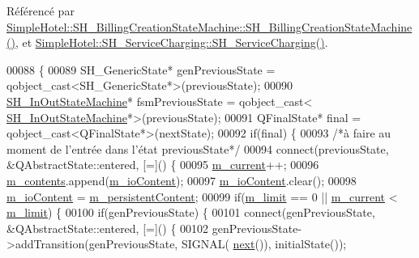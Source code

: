 Référencé par \hyperlink{classSimpleHotel_1_1SH__BillingCreationStateMachine_a8c7d39e11d0ced1fd9c27a5550465b86}{Simple\-Hotel\-::\-S\-H\-\_\-\-Billing\-Creation\-State\-Machine\-::\-S\-H\-\_\-\-Billing\-Creation\-State\-Machine()}, et \hyperlink{classSimpleHotel_1_1SH__ServiceCharging_ae82c86c7e955f0dc93cdfc3603789b87}{Simple\-Hotel\-::\-S\-H\-\_\-\-Service\-Charging\-::\-S\-H\-\_\-\-Service\-Charging()}.


\begin{DoxyCode}
00088 \{
00089     SH\_GenericState* genPreviousState = qobject\_cast<SH\_GenericState*>(previousState);
00090     \hyperlink{classSimpleHotel_1_1SH__InOutStateMachine_af725c1a19c2b13b7f07f3966e632a00b}{SH\_InOutStateMachine}* fsmPreviousState = qobject\_cast<
      \hyperlink{classSimpleHotel_1_1SH__InOutStateMachine_af725c1a19c2b13b7f07f3966e632a00b}{SH\_InOutStateMachine}*>(previousState);
00091     QFinalState* \textcolor{keyword}{final} = qobject\_cast<QFinalState*>(nextState);
00092     \textcolor{keywordflow}{if}(\textcolor{keyword}{final}) \{
00093         \textcolor{comment}{/*à faire au moment de l'entrée dans l'état previousState*/}
00094         connect(previousState, &QAbstractState::entered, [=]() \{
00095             \hyperlink{classSimpleHotel_1_1SH__LoopingInOutStateMachine_a700a3c54ef593c94815a0418d83dd381}{m\_current}++;
00096             \hyperlink{classSimpleHotel_1_1SH__LoopingInOutStateMachine_a46c3dab932ceedeef821a25fa8d6e5dd}{m\_contents}.append(\hyperlink{classSimpleHotel_1_1SH__InOutStateMachine_a4b0a3a48b0da31fddb724a357ad9b52c}{m\_ioContent});
00097             \hyperlink{classSimpleHotel_1_1SH__InOutStateMachine_a4b0a3a48b0da31fddb724a357ad9b52c}{m\_ioContent}.clear();
00098             \hyperlink{classSimpleHotel_1_1SH__InOutStateMachine_a4b0a3a48b0da31fddb724a357ad9b52c}{m\_ioContent} = \hyperlink{classSimpleHotel_1_1SH__LoopingInOutStateMachine_a6ed5f5c62373711ce123fb1a97fc3387}{m\_persistentContent};
00099             \textcolor{keywordflow}{if}(\hyperlink{classSimpleHotel_1_1SH__LoopingInOutStateMachine_ae5e496343aed89d7062e2478218f4e7d}{m\_limit} == 0 || \hyperlink{classSimpleHotel_1_1SH__LoopingInOutStateMachine_a700a3c54ef593c94815a0418d83dd381}{m\_current} < \hyperlink{classSimpleHotel_1_1SH__LoopingInOutStateMachine_ae5e496343aed89d7062e2478218f4e7d}{m\_limit}) \{
00100                 \textcolor{keywordflow}{if}(genPreviousState) \{
00101                     connect(genPreviousState, &QAbstractState::entered, [=]() \{
00102                         genPreviousState->addTransition(genPreviousState, SIGNAL(
      \hyperlink{classSimpleHotel_1_1SH__GenericStateMachine_a2de14d4920ae8c10b70c2d73fc2d4a93}{next}()), initialState());

\end{DoxyCode}
